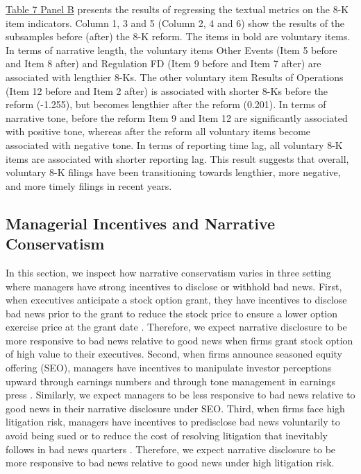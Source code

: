 \documentclass[a4paper]{article}
\begin{document}
\begin{spacing}{2}
\hyperref[T7PB]{Table 7 Panel B} presents the results of regressing the textual metrics on the 8-K item indicators. Column 1, 3 and 5 (Column 2, 4 and 6) show the results of the subsamples before (after) the 8-K reform. The items in bold are voluntary items. In terms of narrative length, the voluntary items Other Events (Item 5 before and Item 8 after) and Regulation FD (Item 9 before and Item 7 after) are associated with lengthier 8-Ks. The other voluntary item Results of Operations (Item 12 before and Item 2 after) is associated with shorter 8-Ks before the reform (-1.255), but becomes lengthier after the reform (0.201). In terms of narrative tone, before the reform Item 9 and Item 12 are significantly associated with positive tone, whereas after the reform all voluntary items become associated with negative tone. In terms of reporting time lag, all voluntary 8-K items are associated with shorter reporting lag. This result suggests that overall, voluntary 8-K filings have been transitioning towards lengthier, more negative, and more timely filings in recent years.

\subsection{Managerial Incentives and Narrative Conservatism}
In this section, we inspect how narrative conservatism varies in three setting where managers have strong incentives to disclose or withhold bad news. First, when executives anticipate a stock option grant, they have incentives to disclose bad news prior to the grant to reduce the stock price to ensure a lower option exercise price at the grant date \cite{aboodyCEOStockOption2000,bakerStockOptionCompensation2003,mcanallyExecutiveStockOptions2008}. Therefore, we expect narrative disclosure to be more responsive to bad news relative to good news when firms grant stock option of high value to their executives. Second, when firms announce seasoned equity offering (SEO), managers have incentives to manipulate investor perceptions upward through earnings numbers \cite{teohEarningsManagementUnderperformance1998} and through tone management in earnings press \cite{huangToneManagement2014}. Similarly, we expect managers to be less responsive to bad news relative to good news in their narrative disclosure under SEO. Third, when firms face high litigation risk, managers have incentives to predisclose bad news voluntarily to avoid being sued or to reduce the cost of resolving litigation that inevitably follows in bad news quarters \cite{skinnerWhyFirmsVoluntarily1994, skinnerEarningsDisclosuresStockholder1997}. Therefore, we expect narrative disclosure to be more responsive to bad news relative to good news under high litigation risk.


\end{spacing}
\end{document}
